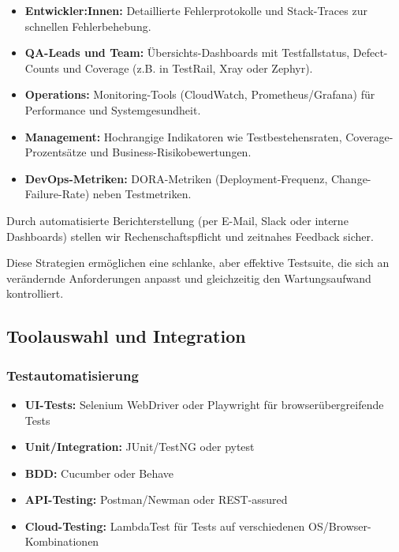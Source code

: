 \begin{itemize}
    \item \textbf{Entwickler:Innen:} Detaillierte Fehlerprotokolle und Stack-Traces zur schnellen
    Fehlerbehebung.
    \item \textbf{QA-Leads und Team:} Übersichts-Dashboards mit Testfallstatus, Defect-Counts und
    Coverage (z.B. in TestRail, Xray oder Zephyr).
    \item \textbf{Operations:} Monitoring-Tools (CloudWatch, Prometheus/Grafana) für Performance
    und Systemgesundheit.
    \item \textbf{Management:} Hochrangige Indikatoren wie Testbestehensraten, Coverage-Prozentsätze
    und Business-Risikobewertungen.
    \item \textbf{DevOps-Metriken:} DORA-Metriken (Deployment-Frequenz, Change-Failure-Rate) neben
    Testmetriken.
\end{itemize}

Durch automatisierte Berichterstellung (per E-Mail, Slack oder interne Dashboards) stellen wir
Rechenschaftspflicht und zeitnahes Feedback sicher.

Diese Strategien ermöglichen eine schlanke, aber effektive Testsuite, die sich an verändernde
Anforderungen anpasst und gleichzeitig den Wartungsaufwand kontrolliert.

\subsection{Toolauswahl und Integration}
\subsubsection{Testautomatisierung}

\begin{itemize}
    \item \textbf{UI-Tests:}  Selenium WebDriver oder Playwright für browserübergreifende Tests
    \item \textbf{Unit/Integration:} JUnit/TestNG oder pytest
    \item \textbf{BDD:} Cucumber oder Behave
    \item \textbf{API-Testing:} Postman/Newman oder REST-assured
    \item \textbf{Cloud-Testing:} LambdaTest für Tests auf verschiedenen OS/Browser-Kombinationen
\end{itemize}

